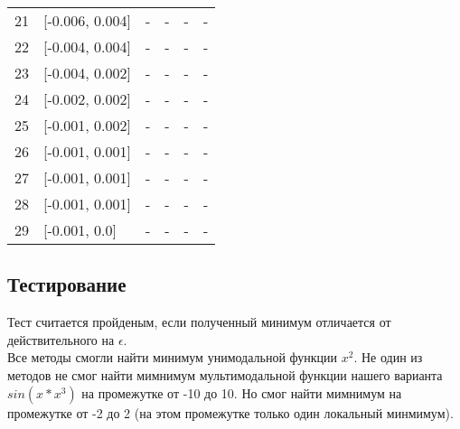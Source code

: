 \documentclass[fleqn]{article}
\begin{document}
\begin{table}[p]
\begin{tabular}{rlllll}
21 & [-0.006, 0.004] & - & - & - & - \\
22 & [-0.004, 0.004] & - & - & - & - \\
23 & [-0.004, 0.002] & - & - & - & - \\
24 & [-0.002, 0.002] & - & - & - & - \\
25 & [-0.001, 0.002] & - & - & - & - \\
26 & [-0.001, 0.001] & - & - & - & - \\
27 & [-0.001, 0.001] & - & - & - & - \\
28 & [-0.001, 0.001] & - & - & - & - \\
29 & [-0.001, 0.0] & - & - & - & - \\
\end{tabular}

\end{table}

\subsection{Тестирование}
Тест считается пройденым, если полученный минимум отличается
от действительного на $\epsilon$.\\
Все методы смогли найти минимум унимодальной функции $x^2$.
Не один из методов не смог найти мимнимум мультимодальной функции
нашего варианта $sin(x*x^3)$ на промежутке от -10 до 10. Но
смог найти мимнимум на промежутке от -2 до 2 (на этом промежутке только один
локальный минмимум).
\end{document}

